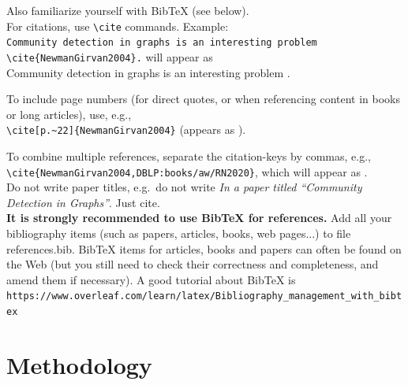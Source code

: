 \documentclass[a4paper,12pt]{Classes/RoboticsLaTeX}
\begin{document}
	\noindent Also familiarize yourself with BibTeX (see below).\\
	
	\noindent For citations, use \verb#\cite# commands. Example:\\
	\verb#Community detection in graphs is an interesting problem \cite{NewmanGirvan2004}.#
	will appear as\\
	Community detection in graphs is an interesting problem \cite{NewmanGirvan2004}.
	
	\noindent To include page numbers (for direct quotes, or when referencing content in books or long articles), use, e.g.,\\ \noindent \verb#\cite[p.~22]{NewmanGirvan2004}# (appears as \cite[p.~22]{NewmanGirvan2004}).
	
	\noindent To combine multiple references, separate the citation-keys by commas, e.g.,\\ 
	\noindent \verb#\cite{NewmanGirvan2004,DBLP:books/aw/RN2020}#, which will appear as \cite{NewmanGirvan2004,DBLP:books/aw/RN2020}.\\
	
	\noindent Do not write paper titles, e.g.~do not write {\em In a paper titled ``Community Detection in Graphs''}. Just cite.\\
	
	
	\textbf{It is strongly recommended to use BibTeX for references.} Add all your bibliography items (such as papers, articles, books, web pages...) to file references.bib. BibTeX items for articles, books and papers can often be found on the Web (but you still need to check their correctness and completeness, and amend them if necessary). A good tutorial about BibTeX is\\
	\verb#https://www.overleaf.com/learn/latex/Bibliography_management_with_bibtex#
	
	\chapter{Methodology}
	\label{chap:methodology}
	
\end{document}

